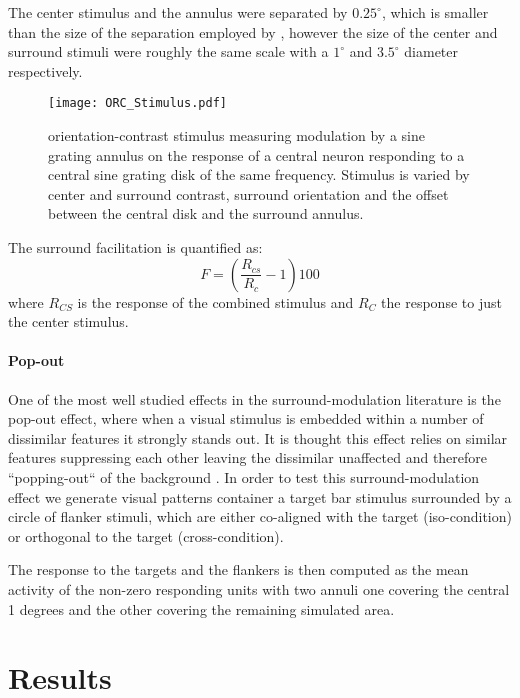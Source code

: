 The center stimulus and the annulus were separated by $0.25^\circ$,
which is smaller than the size of the separation employed by
\cite{Jones2002}, however the size of the center and surround stimuli
were roughly the same scale with a $1^\circ$ and $3.5^\circ$ diameter
respectively.

\begin{figure}
	\centering
        \texttt{[image: ORC\_Stimulus.pdf]}
	\caption{orientation-contrast stimulus measuring modulation by a
      sine grating annulus on the response of a central neuron
      responding to a central sine grating disk of the same frequency.
      Stimulus is varied by center and surround contrast, surround
      orientation and the offset between the central disk and the
      surround annulus.}
	\label{ORC_Stimulus}
\end{figure}

The surround facilitation is quantified as:
\begin{equation}
F = (\frac{R_{cs}}{R_c} - 1) 100
\end{equation}
where $R_{CS}$ is the response of the combined stimulus and $R_C$ the
response to just the center stimulus.

\paragraph{Pop-out}

One of the most well studied effects in the surround-modulation
literature is the pop-out effect, where when a visual stimulus is
embedded within a number of dissimilar features it strongly stands
out. It is thought this effect relies on similar features suppressing
each other leaving the dissimilar unaffected and therefore
``popping-out`` of the background \citep{Kastner1997}. In order to
test this surround-modulation effect we generate visual patterns
container a target bar stimulus surrounded by a circle of flanker
stimuli, which are either co-aligned with the target (iso-condition)
or orthogonal to the target (cross-condition).

The response to the targets and the flankers is then computed as the
mean activity of the non-zero responding units with two annuli one
covering the central 1 degrees and the other covering the remaining
simulated area.

\section{Results}

